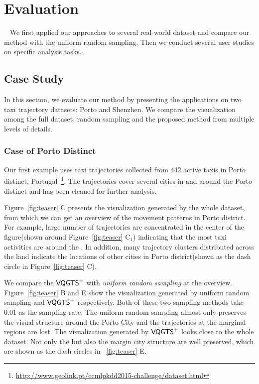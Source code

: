 \section{Evaluation}~\label{sec:exp}
We first applied our approaches to several real-world dataset and compare our method with the uniform random sampling. Then we conduct several user studies on specific analysis tasks. 
\subsection{Case Study}
In this section, we evaluate our method by presenting the applications on two taxi trajectory datasets: Porto and Shenzhen. We compare the visualization among the full dataset, random sampling and the proposed method from multiple levels of details. 
\subsubsection{Case of Porto Distinct}
Our first example uses taxi trajectories collected from 442 active taxis in Porto distinct, Portugal~\footnote{\url{http://www.geolink.pt/ecmlpkdd2015-challenge/dataset.html}}. The trajectories cover several cities in and around the Porto distinct and has been cleaned for further analysis.


Figure~\ref{fig:teaser} C presents the visualization generated by the whole dataset, from which we can get an overview of the movement patterns in Porto district. For example, large number of trajectories are concentrated in the center of the figure(shown around Figure~\ref{fig:teaser} C$_1$) indicating that the most taxi activities are around the . In addition, 
many trajectory clusters distributed across the land indicate the locations of other cities in Porto district(shown as the dash circle in Figure~\ref{fig:teaser} C). 

We compare the $\mathsf{VQGTS}^{+}$ with \textit{uniform random sampling} at the overview. 
Figure~\ref{fig:teaser} B and E show the visualization generated by uniform random sampling and $\mathsf{VQGTS}^{+}$ respectively. Both of these two sampling methods take 0.01 as the sampling rate. The uniform random sampling almost only preserves the visual structure around the Porto City and the trajectories at the marginal regions are lost.
The visualization generated by $\mathsf{VQGTS}^{+}$ looks close to the whole dataset. Not only the  but also the margin city structure are well preserved, which are shown as the dash circles in ~\ref{fig:teaser} E.
 
